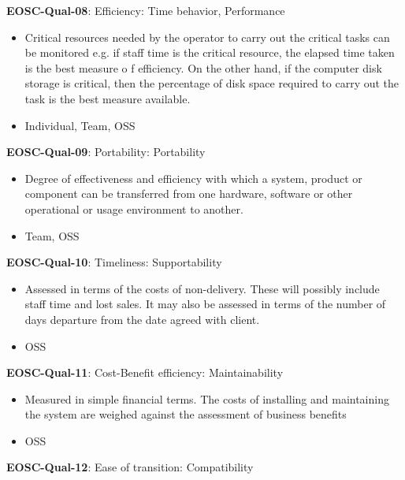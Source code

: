 \textbf{EOSC-Qual-08}: Efficiency: Time behavior, Performance

\begin{itemize}
    \item Critical resources needed by the operator to carry out the critical tasks can be monitored e.g. if staff time is the critical resource, the elapsed time taken is the best measure o f efficiency. On the other hand, if the computer disk storage is critical, then the percentage of disk space required to carry out the task is the best measure available. \cite{iso_25010_2011_2017,gillies_modelling_1992,boehm_quantitative_1976}
    \item Individual, Team, OSS
\end{itemize}

\textbf{EOSC-Qual-09}: Portability: Portability

\begin{itemize}
    \item Degree of effectiveness and efficiency with which a system, product or component can be transferred from one hardware, software or other operational or usage environment to another. \cite{iso_25010_2011_2017,gillies_modelling_1992,boehm_quantitative_1976,shepherdson_cessda_2019,raymond_software_2013}
    \item Team, OSS
\end{itemize}

\textbf{EOSC-Qual-10}: Timeliness: Supportability

\begin{itemize}
    \item Assessed in terms of the costs of non-delivery. These will possibly include staff time and lost sales. It may also be assessed in terms of the number of days departure from the date agreed with client. \cite{gillies_modelling_1992}
    \item OSS
\end{itemize}

\textbf{EOSC-Qual-11}: Cost-Benefit efficiency: Maintainability

\begin{itemize}
    \item Measured in simple financial terms. The costs of installing and maintaining the system are weighed against the assessment of business benefits \cite{gillies_modelling_1992}
    \item OSS
\end{itemize}

\textbf{EOSC-Qual-12}: Ease of transition: Compatibility

